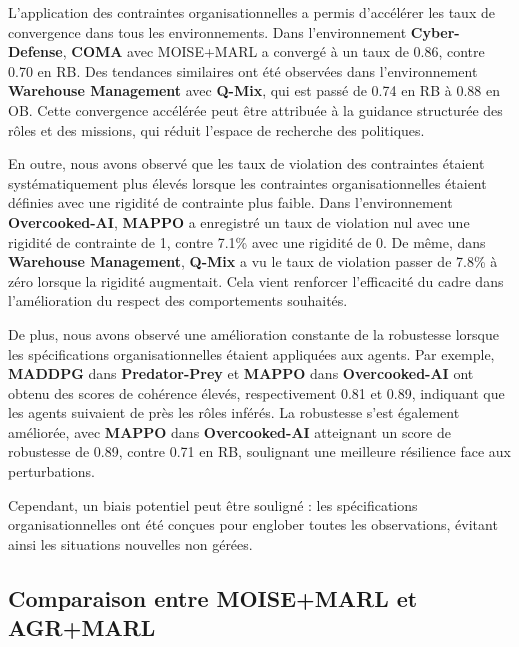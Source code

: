\documentclass[dissemination]{jfsma}
\begin{document}
L'application des contraintes organisationnelles a permis d'accélérer les taux de convergence dans tous les environnements. Dans l'environnement \textbf{Cyber-Defense}, \textbf{COMA} avec MOISE+MARL a convergé à un taux de 0.86, contre 0.70 en RB. Des tendances similaires ont été observées dans l'environnement \textbf{Warehouse Management} avec \textbf{Q-Mix}, qui est passé de 0.74 en RB à 0.88 en OB. Cette convergence accélérée peut être attribuée à la guidance structurée des rôles et des missions, qui réduit l'espace de recherche des politiques.

En outre, nous avons observé que les taux de violation des contraintes étaient systématiquement plus élevés lorsque les contraintes organisationnelles étaient définies avec une rigidité de contrainte plus faible. Dans l'environnement \textbf{Overcooked-AI}, \textbf{MAPPO} a enregistré un taux de violation nul avec une rigidité de contrainte de 1, contre 7.1\% avec une rigidité de 0. De même, dans \textbf{Warehouse Management}, \textbf{Q-Mix} a vu le taux de violation passer de 7.8\% à zéro lorsque la rigidité augmentait. Cela vient renforcer l'efficacité du cadre dans l'amélioration du respect des comportements souhaités.

De plus, nous avons observé une amélioration constante de la robustesse lorsque les spécifications organisationnelles étaient appliquées aux agents. Par exemple, \textbf{MADDPG} dans \textbf{Predator-Prey} et \textbf{MAPPO} dans \textbf{Overcooked-AI} ont obtenu des scores de cohérence élevés, respectivement 0.81 et 0.89, indiquant que les agents suivaient de près les rôles inférés. La robustesse s'est également améliorée, avec \textbf{MAPPO} dans \textbf{Overcooked-AI} atteignant un score de robustesse de 0.89, contre 0.71 en RB, soulignant une meilleure résilience face aux perturbations.

Cependant, un biais potentiel peut être souligné : les spécifications organisationnelles ont été conçues pour englober toutes les observations, évitant ainsi les situations nouvelles non gérées.

\subsection{Comparaison entre MOISE+MARL et AGR+MARL}
\end{document}
